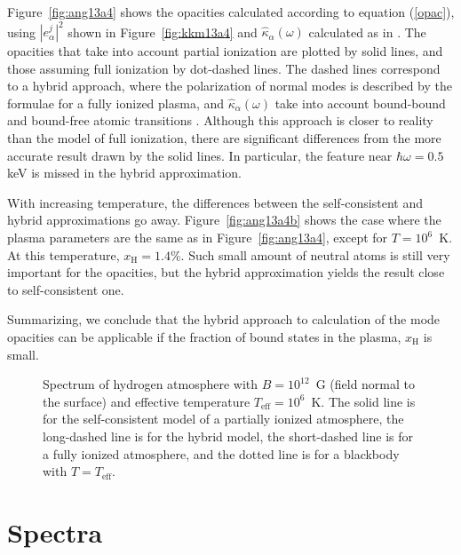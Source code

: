 \documentclass{emulateapj}
\newcommand{\req}[1]{equation (\ref{#1})}
\newcommand{\Teff}{T_\mathrm{eff}}
\newcommand{\xH}{x_\mathrm{H}}
\begin{document}
Figure~\ref{fig:ang13a4} shows the opacities calculated
according to \req{opac}, using $|e^j_\alpha|^2$ 
shown in Figure~\ref{fig:kkm13a4}
and $\hat\kappa_\alpha(\omega)$
calculated as in \citet{PC03,PC04}.
The opacities that take into account partial ionization
are plotted by solid lines, and those assuming full ionization by
dot-dashed lines. The dashed lines correspond to a hybrid approach,
where the polarization
of normal modes is described by
the formulae for a fully ionized plasma,
and
$\hat\kappa_\alpha(\omega)$ take into account bound-bound 
and bound-free atomic transitions
\citep{PC03}. Although this approach
is closer to reality than the model of full ionization,
there are significant differences from the more accurate result
drawn by the solid lines. In particular, the feature near 
$\hbar\omega=0.5$ keV is missed in the hybrid approximation.

With increasing temperature, the differences between
the self-consistent and hybrid approximations go away.
Figure~\ref{fig:ang13a4b} shows the case where the plasma
parameters are the same as in Figure~\ref{fig:ang13a4},
except for $T=10^6$~K. At this temperature, $\xH=1.4$\%.
Such small amount of neutral atoms is still very important 
for the opacities, but the hybrid approximation
yields the result close to self-consistent one.

Summarizing, we conclude that the hybrid approach to
calculation of the mode opacities can be applicable
if the fraction of bound states in the plasma, $\xH$
is small.

\begin{figure}
\caption{Spectrum of hydrogen atmosphere with $B=10^{12}$~G
(field normal to the surface)
and effective temperature
$\Teff=10^6$~K. The solid line is for the self-consistent
model of a partially ionized atmosphere, the long-dashed line 
is for the hybrid model, the short-dashed line is for a fully
ionized atmosphere, and the dotted line is for a blackbody
with $T=\Teff$.
\label{fig:f121}}
\end{figure}

\section{Spectra}
\label{sect:spectra}
\end{document}

